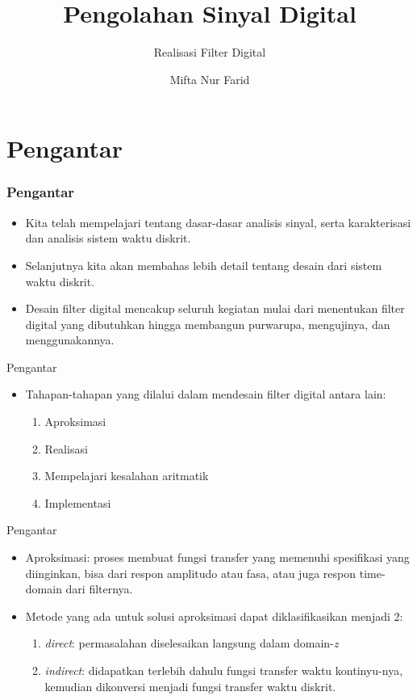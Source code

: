 \documentclass[pdflatex,compress,mathserif]{beamer}
\title{Pengolahan Sinyal Digital}
\subtitle{Realisasi Filter Digital}
\author{Mifta Nur Farid}
\begin{document}
\maketitle

\section{Pengantar}

\begin{frame}
	\frametitle{Pengantar}
	\begin{itemize}
		\item Kita telah mempelajari tentang dasar-dasar analisis sinyal, serta karakterisasi dan analisis sistem waktu diskrit.
		\item Selanjutnya kita akan membahas lebih detail tentang desain dari sistem waktu diskrit.
		\item Desain filter digital mencakup seluruh kegiatan mulai dari menentukan filter digital yang dibutuhkan hingga membangun purwarupa, mengujinya, dan menggunakannya.
	\end{itemize}
\end{frame}

\begin{frame}{Pengantar}
	\begin{itemize}
		\item Tahapan-tahapan yang dilalui dalam mendesain filter digital antara lain:
		\begin{enumerate}
			\item Aproksimasi
			\item Realisasi
			\item Mempelajari kesalahan aritmatik
			\item Implementasi
		\end{enumerate}
	\end{itemize}
\end{frame}

\begin{frame}{Pengantar}
	\begin{itemize}
		\item Aproksimasi: proses membuat fungsi transfer yang memenuhi spesifikasi yang diinginkan, bisa dari respon amplitudo atau fasa, atau juga respon time-domain dari filternya.
		\item Metode yang ada untuk solusi aproksimasi dapat diklasifikasikan menjadi 2:
		\begin{enumerate}
			\item \textit{direct}: permasalahan diselesaikan langsung dalam domain-\textit{z}
			\item \textit{indirect}: didapatkan terlebih dahulu fungsi transfer waktu kontinyu-nya, kemudian dikonversi menjadi fungsi transfer waktu diskrit.
		\end{enumerate}
	\end{itemize}
\end{frame}
\end{document}
